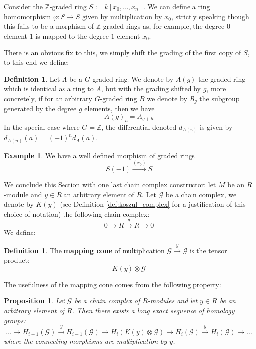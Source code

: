 \documentclass[12pt]{article}
\theoremstyle{plain}
\newtheorem{proposition}[thm]{Proposition}
\theoremstyle{definition}
\newtheorem{defn}[thm]{Definition} %
\newtheorem{example}[thm]{Example}
\newcommand{\bb}[1]{\mathbb{#1}}
\newcommand{\scr}[1]{\mathscr{#1}}
\newcommand{\lto}{\longrightarrow}
\begin{document}
	Consider the $\bb{Z}$-graded ring $S := k[x_0,...,x_n]$. We can define a ring homomorphism $\varphi: S \lto S$ given by multiplication by $x_0$, strictly speaking though this fails to be a morphism of $\bb{Z}$-graded rings as, for example, the degree $0$ element $1$ is mapped to the degree $1$ element $x_0$.
	
	There is an obvious fix to this, we simply shift the grading of the first copy of $S$, to this end we define:
	\begin{defn}
		Let $A$ be a $G$-graded ring. We denote by $A(g)$ the graded ring which is identical as a ring to $A$, but with the grading shifted by $g$, more concretely, if for an arbitrary $G$-graded ring $B$ we denote by $B_g$ the subgroup generated by the degree $g$ elements, then we have
		\begin{equation}
			A(g)_h = A_{g + h}
		\end{equation}
		In the special case where $G = \bb{Z}$, the differential denoted $d_{A(n)}$ is given by $d_{A(n)}(a) = (-1)^nd_A(a)$.
	\end{defn}
	\begin{example}
		We have a well defined morphism of graded rings
		\begin{equation}
			S(-1) \stackrel{(x_0)}{\lto}S
		\end{equation}
	\end{example}
	We conclude this Section with one last chain complex constructor: let $M$ be an $R$-module and $y \in R$ an arbitrary element of $R$.  Let $\scr{G}$ be a chain complex, we denote by $K(y)$ (see Definition \ref{def:koszul_complex} for a justification of this choice of notation) the following chain complex:
	\begin{equation}
		0 \lto R \stackrel{y}{\lto} R \lto 0
	\end{equation}
	We define:
	\begin{defn}
		The \textbf{mapping cone} of multiplication $\scr{G} \stackrel{y}{\lto} \scr{G}$ is the tensor product:
		\begin{equation}
			K(y) \otimes \scr{G}
		\end{equation}
	\end{defn}
	The usefulness of the mapping cone comes from the following property:
	\begin{proposition}\label{prop:mapping_exact_sequence}
		Let $\scr{G}$ be a chain complex of $R$-modules and let $y\in R$ be an arbitrary element of $R$. Then there exists a long exact sequence of homology groups:
		\begin{equation}\label{eq:mapping_exact_sequence}
			\hdots \lto H_{i-1}(\scr{G}) \stackrel{y}{\lto} H_{i-1}(\scr{G}) \lto H_{i}(K(y) \otimes \scr{G})\lto H_i(\scr{G}) \stackrel{y}{\lto} H_{i}(\scr{G}) \lto \hdots
		\end{equation}
		where the connecting morphisms are multiplication by $y$.
	\end{proposition}
\end{document}
